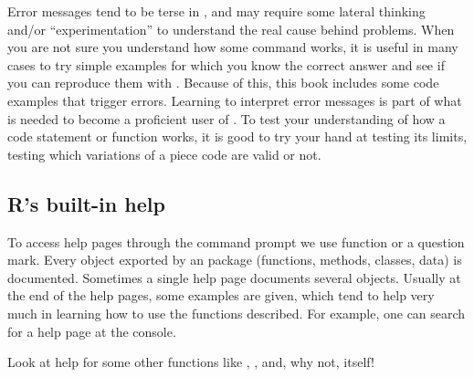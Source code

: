 \documentclass[krantz2]{krantz}\usepackage{knitr}
\begin{document}
\begin{warningbox}
Error messages tend to be terse in \Rpgrm, and may require some lateral thinking and/or ``experimentation'' to understand the real cause behind problems. When you are not sure you understand how some command works, it is useful in many cases to try simple examples for which you know the correct answer and see if you can reproduce them with \Rpgrm. Because of this, this book includes some code examples that trigger errors. Learning to interpret error messages is part of what is needed to become a proficient user of \Rlang. To test your understanding of how a code statement or function works, it is good to try your hand at testing its limits, testing which variations of a piece code are valid or not.
\end{warningbox}

\subsection{R's built-in help}

To access help pages through the command prompt we use function  or a question mark. Every object exported by an \Rlang package (functions, methods, classes, data) is documented. Sometimes a single help page documents several \Rlang objects. Usually at the end of the help pages, some examples are given, which tend to help very much in learning how to use the functions described. For example, one can search for a help page at the \Rpgrm console.

\begin{knitrout}\footnotesize
{}\color{fgcolor}\begin{kframe}
\begin{alltt}
\hlstd{(}\hlstd{)}
\end{alltt}
\end{kframe}
\end{knitrout}

\begin{playground}
Look at help for some other functions like , ,  and, why not,  itself!

\begin{knitrout}\footnotesize
{}\color{fgcolor}\begin{kframe}
\begin{alltt}
\end{alltt}
\end{kframe}
\end{knitrout}
\end{playground}
\end{document}
